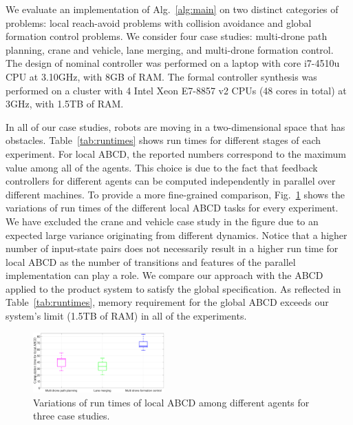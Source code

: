 We evaluate an implementation of Alg.~\ref{alg:main}
on two distinct categories of problems: 
local reach-avoid problems with collision avoidance and global formation control problems. 
We consider four case studies: multi-drone path planning, crane and vehicle, lane merging, and multi-drone formation control. 
The design of nominal controller was performed on a laptop with core i7-4510u CPU at 3.10GHz, with 8GB of RAM.
The formal controller synthesis was performed on a cluster with 4 Intel Xeon E7-8857 v2 CPUs (48 cores in total) at 3GHz, with 1.5TB of RAM. 

In all of our case studies, robots are moving in a two-dimensional space that has obstacles. 
Table~\ref{tab:runtimes} shows run times for different stages of each experiment. 
For local ABCD, the reported numbers correspond to the maximum value among all of the agents. 
This choice is due to the fact that feedback controllers for different agents can be computed independently 
in parallel over different machines. 
To provide a more fine-grained comparison,
Fig.~\ref{fig:box_plot} shows the variations of run times of the different local ABCD tasks for every experiment. 
We have excluded the crane and vehicle case study in the figure due to an expected large variance originating from different dynamics.
Notice that a higher number of input-state pairs does not necessarily result in a higher run time for local ABCD as the 
number of transitions and features of the parallel implementation can play a role. 
%
We compare our approach with the ABCD applied to the product system to satisfy the global specification. 
As reflected in Table~\ref{tab:runtimes}, memory requirement for the global ABCD exceeds our system's limit (1.5TB of RAM) in all of the experiments.
%

\begin{figure}[t]
	\centering
	\includegraphics[width=0.45\textwidth]{figures/boxPlot2.eps}
	\caption{Variations of run times of local ABCD among different agents for three case studies.}
	\label{fig:box_plot}
\end{figure}

